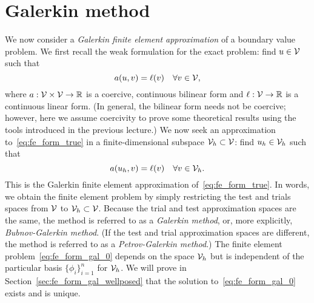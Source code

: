 
  


\section{Galerkin method}
We now consider a \emph{Galerkin finite element approximation} of a boundary value problem.  We first recall the weak formulation for the exact problem: find $u \in \mathcal{V}$ such that
\begin{equation}
  a(u,v) = \ell(v) \quad \forall v \in \mathcal{V},
  \label{eq:fe_form_true}
\end{equation}
where $a: \mathcal{V} \times \mathcal{V} \to \mathbb{R}$ is a coercive, continuous bilinear form and $\ell: \mathcal{V} \to \mathbb{R}$ is a continuous linear form.  (In general, the bilinear form needs not be coercive; however, here we assume coercivity to prove some theoretical results using the tools introduced in the previous lecture.) We now seek an approximation to~\eqref{eq:fe_form_true} in a finite-dimensional subspace $\mathcal{V}_h \subset \mathcal{V}$: find $u_h \in \mathcal{V}_h$ such that
\begin{equation}
  a(u_h,v) = \ell(v) \quad \forall v \in \mathcal{V}_h.
  \label{eq:fe_form_gal_0}
\end{equation}
This is the Galerkin finite element approximation of~\eqref{eq:fe_form_true}. In words, we obtain the finite element problem by simply restricting the test and trials spaces from $\mathcal{V}$ to $\mathcal{V}_h \subset \mathcal{V}$.  Because the trial and test approximation spaces are the same, the method is referred to as a \emph{Galerkin method}, or, more explicitly, \emph{Bubnov-Galerkin method}.  (If the test and trial approximation spaces are different, the method is referred to as a \emph{Petrov-Galerkin method}.) The finite element problem~\eqref{eq:fe_form_gal_0} depends on the space $\mathcal{V}_h$ but is independent of the particular basis $\{ \phi_i \}_{i=1}^n$ for $\mathcal{V}_h$.  We will prove in Section~\ref{sec:fe_form_gal_wellposed} that the solution to~\eqref{eq:fe_form_gal_0} exists and is unique.

